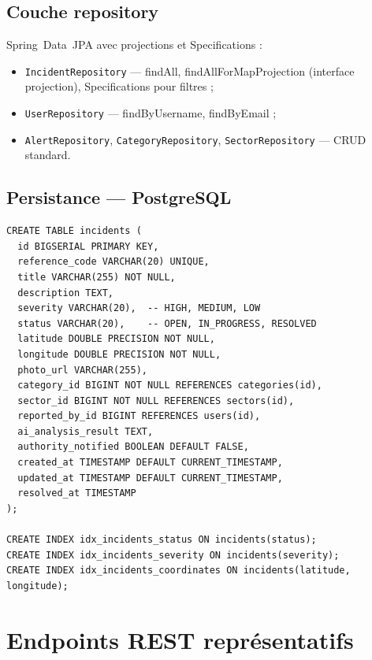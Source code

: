 \documentclass[12pt,a4paper,twoside,openright]{book}
\begin{document}
\subsection{Couche repository}
Spring~Data~JPA avec projections et Specifications :
\begin{itemize}
  \item \texttt{IncidentRepository} — findAll, findAllForMapProjection (interface projection), Specifications pour filtres ;
  \item \texttt{UserRepository} — findByUsername, findByEmail ;
  \item \texttt{AlertRepository}, \texttt{CategoryRepository}, \texttt{SectorRepository} — CRUD standard.
\end{itemize}

\subsection{Persistance — PostgreSQL}
\begin{lstlisting}[style=sqlurban,caption=Schéma conceptuel incidents.,label=lst:schema]
CREATE TABLE incidents (
  id BIGSERIAL PRIMARY KEY,
  reference_code VARCHAR(20) UNIQUE,
  title VARCHAR(255) NOT NULL,
  description TEXT,
  severity VARCHAR(20),  -- HIGH, MEDIUM, LOW
  status VARCHAR(20),    -- OPEN, IN_PROGRESS, RESOLVED
  latitude DOUBLE PRECISION NOT NULL,
  longitude DOUBLE PRECISION NOT NULL,
  photo_url VARCHAR(255),
  category_id BIGINT NOT NULL REFERENCES categories(id),
  sector_id BIGINT NOT NULL REFERENCES sectors(id),
  reported_by_id BIGINT REFERENCES users(id),
  ai_analysis_result TEXT,
  authority_notified BOOLEAN DEFAULT FALSE,
  created_at TIMESTAMP DEFAULT CURRENT_TIMESTAMP,
  updated_at TIMESTAMP DEFAULT CURRENT_TIMESTAMP,
  resolved_at TIMESTAMP
);

CREATE INDEX idx_incidents_status ON incidents(status);
CREATE INDEX idx_incidents_severity ON incidents(severity);
CREATE INDEX idx_incidents_coordinates ON incidents(latitude, longitude);
\end{lstlisting}

\section{Endpoints REST représentatifs}
\end{document}
